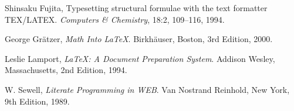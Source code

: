 \documentclass[12pt, a4paper]{article}
\begin{document}
\begin{thebibliography}{9} 

   Shinsaku Fujita,
   Typesetting structural formulae with the text formatter TEX/LATEX.
   \emph{Computers \& Chemistry},
   18:2, 109--116, 1994.      
   
   George Gr\"atzer,
   \emph{Math Into \LaTeX{}}.
   Birkh\"auser, Boston,
   3rd Edition, 2000.  
    
   Leslie Lamport,
   \emph{\LaTeX: A Document Preparation System}.
   Addison Wesley, Massachusetts,
   2nd Edition, 1994.    

   W. Sewell,
   \emph{Literate Programming in WEB}.
   Van Nostrand Reinhold, New York,
   9th Edition, 1989.

\end{thebibliography}
\end{document}
